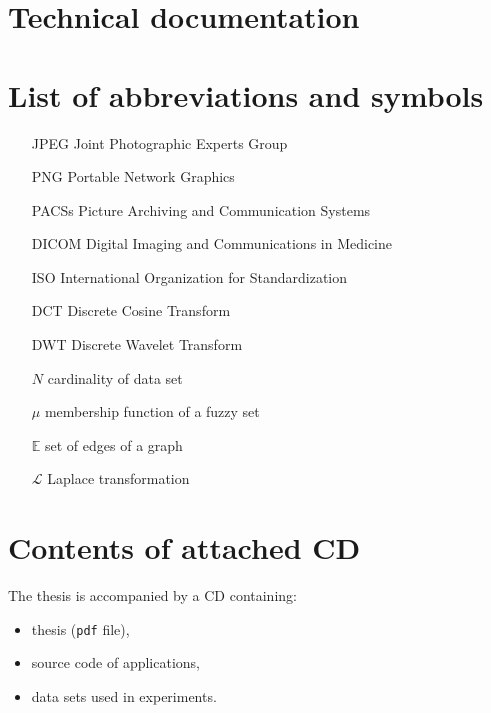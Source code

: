 \chapter*{Technical documentation}

\chapter*{List of abbreviations and symbols}

\begin{itemize}
\item[JPEG] Joint Photographic Experts Group
\item[PNG] Portable Network Graphics
\item[PACSs] Picture Archiving and Communication Systems
\item[DICOM] Digital Imaging and Communications in Medicine
\item[ISO] International Organization for Standardization
\item[DCT] Discrete Cosine Transform
\item[DWT] Discrete Wavelet Transform
\item[$N$] cardinality of data set
\item[$\mu$] membership function of a fuzzy set
\item[$\mathbb{E}$] set of edges of a graph
\item[$\mathcal{L}$] Laplace transformation
\end{itemize}

\chapter*{Contents of attached CD}

The thesis is accompanied by a CD containing:
\begin{itemize}
\item thesis (\texttt{pdf} file),
\item source code of applications,
\item data sets used in experiments.
\end{itemize}
